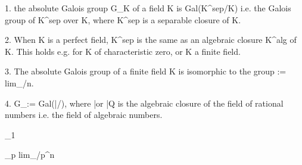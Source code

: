 
1. the absolute Galois group G_K of a field K is Gal(K^sep/K) 
i.e. the Galois group of K^sep over K, where K^sep is a separable closure of K.

2. When K is a perfect field, K^sep is the same as an algebraic closure K^alg of K. 
This holds e.g. for K of characteristic zero, or K a finite field. 

3. The absolute Galois group of a finite field K is isomorphic to the group
 := lim_\larr {}/n. 

4. G_\Q := Gal(\bar\Q/\Q), where \bar\Q or \bar Q is the algebraic closure of 
the field of rational numbers i.e. the field of algebraic numbers.

\F_1

\Z_p  lim_{\larr}\Z/p^n\Z
